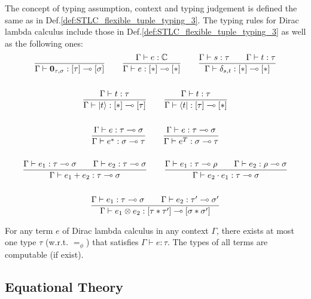 \begin{definition}
  \label{def:Dirac_typing_3}
  The concept of typing assumption, context and typing judgement is defined the same as in Def.\ref{def:STLC_flexible_tuple_typing_3}. The typing rules for Dirac lambda calculus include those in Def.\ref{def:STLC_flexible_tuple_typing_3} as well as the following ones:
  \begin{gather*}
    \frac{}{\Gamma \vdash \mathbf{0}_{\tau, \sigma} : [\tau] \multimap [\sigma]}
    \qquad
    \frac{\Gamma \vdash e : \mathbb{C}}{\Gamma \vdash e : [*] \multimap [*]}
    \qquad
    \frac{\Gamma \vdash s : \tau \qquad \Gamma \vdash t : \tau}{\Gamma \vdash \delta_{s, t} : [*] \multimap [*]}\\
    \ \\
    \frac{\Gamma \vdash t : \tau}{\Gamma \vdash |t\rangle : [*] \multimap [\tau]}
    \qquad 
    \frac{\Gamma \vdash t : \tau}{\Gamma \vdash \langle t| : [\tau] \multimap [*]}\\
    \ \\
    \frac{\Gamma \vdash e : \tau \multimap \sigma}{\Gamma \vdash e^* : \sigma \multimap \tau}
    \qquad
    \frac{\Gamma \vdash e : \tau \multimap \sigma}{\Gamma \vdash e^T : \sigma \multimap \tau}\\
    \ \\
    \frac{\Gamma \vdash e_1 : \tau \multimap \sigma \qquad \Gamma \vdash e_2 : \tau \multimap \sigma }{\Gamma \vdash e_1 + e_2 : \tau \multimap \sigma }
    \qquad 
    \frac{\Gamma \vdash e_1 : \tau \multimap \rho\qquad \Gamma \vdash e_2 : \rho \multimap \sigma}{\Gamma \vdash e_2 \cdot e_1 : \tau \multimap \sigma}\\
    \ \\
    \frac{\Gamma \vdash e_1 : \tau \multimap \sigma \qquad \Gamma \vdash e_2 : \tau' \multimap \sigma'}{\Gamma \vdash e_1 \otimes e_2 : [\tau * \tau'] \multimap [\sigma * \sigma']}
  \end{gather*}
  
\end{definition}

\begin{claim}
  For any term $e$ of Dirac lambda calculus in any context $\Gamma$, there exists at most one type $\tau$ (w.r.t. $=_\phi$) that satisfies $\Gamma \vdash e : \tau$. The types of all terms are computable (if exist).
\end{claim}


\subsection{Equational Theory}

